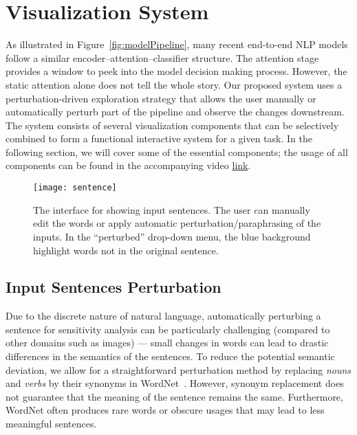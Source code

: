 
\section{Visualization System}
As illustrated in Figure~\ref{fig:modelPipeline}, many recent end-to-end NLP models follow a similar encoder--attention--classifier structure. The attention stage provides a window to peek into the model decision making process. 
However, the static attention alone does not tell the whole story. 
Our proposed system uses a perturbation-driven exploration strategy that allows the user manually or automatically perturb part of the pipeline and observe the changes downstream.
%
The system consists of several visualization components that can be selectively combined to form a functional interactive system for a given task. In the following section, we will cover some of the essential components; the usage of all components can be found in the accompanying video \href{https://www.youtube.com/watch?v=dcpTyWfBhp0}{link}.

\begin{figure}[htbp]
\centering
\vspace{-2mm}
 \texttt{[image: sentence]}
 \vspace{-2mm}
 \caption{
The interface for showing input sentences. The user can manually edit the words or apply automatic perturbation/paraphrasing of the inputs. In the ``perturbed'' drop-down menu, the blue background highlight words not in the original sentence.
 }
 \vspace{-1mm}
\label{fig:sentence}
\end{figure}

\subsection{Input Sentences Perturbation}
\label{sec:perturb}
Due to the discrete nature of natural language, automatically perturbing a sentence for sensitivity analysis can be particularly challenging (compared to other domains such as images) --- small changes in words can lead to drastic differences in the semantics of the sentences.
To reduce the potential semantic deviation, we allow for a straightforward perturbation method by replacing \emph{nouns} and \emph{verbs} by their synonyms in WordNet~\cite{Miller1995}. However, synonym replacement does not guarantee that the meaning of the sentence remains the same. Furthermore, WordNet often produces rare words or obscure usages that may lead to less meaningful sentences.

